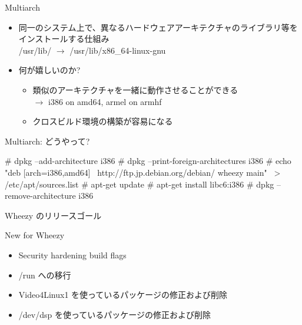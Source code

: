 \begin{frame}{Multiarch}

\begin{itemize}
  \item 同一のシステム上で、異なるハードウェアアーキテクチャのライブラリ等をインストールする仕組み\\
  /usr/lib/ $\rightarrow$ /usr/lib/x86\_64-linux-gnu\\
  \item 何が嬉しいのか?
  \begin{itemize}
    \item 類似のアーキテクチャを一緒に動作させることができる\\
    $\rightarrow$ i386 on amd64, armel on armhf \\
    \item クロスビルド環境の構築が容易になる
  \end{itemize}
\end{itemize}

\end{frame}

\begin{frame}[containsverbatim]{Multiarch: どうやって?}

\begin{commandline}
# dpkg --add-architecture i386
# dpkg --print-foreign-architectures
i386
# echo "deb [arch=i386,amd64] \
  http://ftp.jp.debian.org/debian/ wheezy main" \
   > /etc/apt/sources.list
# apt-get update
# apt-get install libc6:i386   
# dpkg --remove-architecture i386
\end{commandline}

\end{frame}


\begin{frame}{Wheezy のリリースゴール}

New for Wheezy
\begin{itemize}

  \item Security hardening build flags
  \item /run への移行
  \item Video4Linux1 を使っているパッケージの修正および削除
  \item /dev/dsp を使っているパッケージの修正および削除
\end{itemize}

\end{frame}



